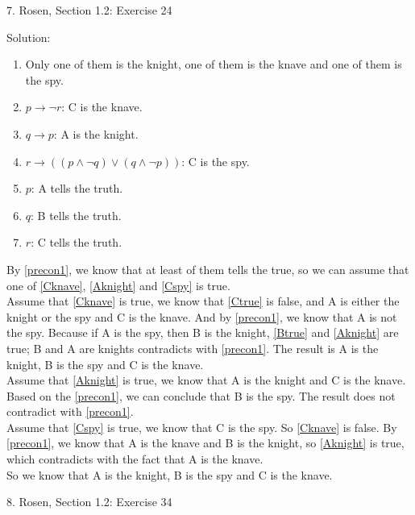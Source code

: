 \documentclass[12pt]{article}
\begin{document}
7. Rosen, Section 1.2: Exercise 24

\indent Solution:\\
\begin{enumerate}
\item \label{precon1} Only one of them is the knight, one of them is the knave and one of them is the spy.
\item \label{Cknave} $p \to \lnot r$: C is the knave.
\item \label{Aknight} $q \to p$: A is the knight.
\item \label{Cspy} $r \to ((p \land \lnot q) \lor (q \land \lnot p))$: C is the spy.
\item \label{Atrue} $p$: A tells the truth.
\item \label{Btrue} $q$: B tells the truth.
\item \label{Ctrue} $r$: C tells the truth.
\end{enumerate}

By \ref{precon1}, we know that at least of them tells the true, so we can assume that one of \ref{Cknave}, \ref{Aknight} and \ref{Cspy} is true.\\
\indent Assume that \ref{Cknave} is true, we know that \ref{Ctrue} is false, and A is either the knight or the spy and C is the knave. And by \ref{precon1}, we know that A is not the spy. Because if A is the spy, then B is the knight, \ref{Btrue} and \ref{Aknight} are true; B and A are knights contradicts with \ref{precon1}. The result is A is the knight, B is the spy and C is the knave.\\ 
\indent Assume that \ref{Aknight} is true, we know that A is the knight and C is the knave. Based on the \ref{precon1}, we can conclude that B is the spy. The result does not contradict with \ref{precon1}.\\
\indent Assume that \ref{Cspy} is true, we know that C is the spy. So \ref{Cknave} is false. By \ref{precon1}, we know that A is the knave and B is the knight, so \ref{Aknight} is true, which contradicts with the fact that A is the knave.\\
\indent So we know that A is the knight, B is the spy and C is the knave.
\newline

8. Rosen, Section 1.2: Exercise 34
\end{document}
